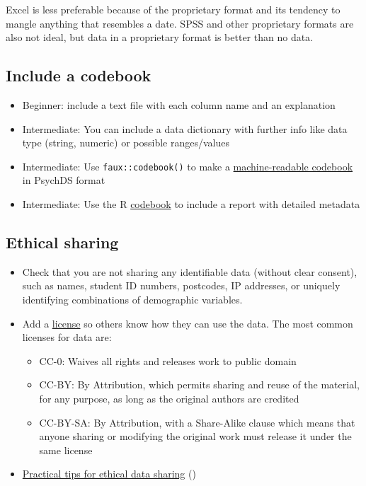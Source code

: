 \documentclass[
  oneside]{book}
\providecommand{\tightlist}{%
  \setlength{\itemsep}{0pt}\setlength{\parskip}{0pt}}
\begin{document}
Excel is less preferable because of the proprietary format and its tendency to mangle anything that resembles a date. SPSS and other proprietary formats are also not ideal, but data in a proprietary format is better than no data.

\hypertarget{include-a-codebook}{%
\subsection{Include a codebook}\label{include-a-codebook}}

\begin{itemize}
\tightlist
\item
  {Beginner}: include a text file with each column name and an explanation
\item
  {Intermediate}: You can include a data dictionary with further info like data type (string, numeric) or possible ranges/values \citep{buchanan2021getting}
\item
  {Intermediate}: Use \texttt{faux::codebook()} to make a \href{https://debruine.github.io/faux/articles/codebook.html}{machine-readable codebook} in PsychDS format
\item
  {Intermediate}: Use the R \href{https://rubenarslan.github.io/codebook/articles/codebook_tutorial.html}{codebook} to include a report with detailed metadata \citep{horstmann2020generating}
\end{itemize}

\hypertarget{ethical-sharing}{%
\subsection{Ethical sharing}\label{ethical-sharing}}

\begin{itemize}
\tightlist
\item
  Check that you are not sharing any identifiable data (without clear consent), such as names, student ID numbers, postcodes, IP addresses, or uniquely identifying combinations of demographic variables.
\item
  Add a \href{https://www.ucl.ac.uk/library/research-support/research-data-management/licenses-data-sharing-creative-commons}{license} so others know how they can use the data. The most common licenses for data are:

  \begin{itemize}
  \tightlist
  \item
    CC-0: Waives all rights and releases work to public domain
  \item
    CC-BY: By Attribution, which permits sharing and reuse of the material, for any purpose, as long as the original authors are credited
  \item
    CC-BY-SA: By Attribution, with a Share-Alike clause which means that anyone sharing or modifying the original work must release it under the same license
  \end{itemize}
\item
  \href{https://doi.org/10.1177/2515245917747656}{Practical tips for ethical data sharing} (\citet{meyer2018practical})
\end{itemize}
\end{document}
